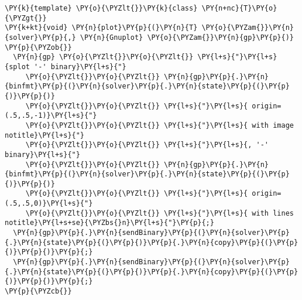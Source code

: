 \begin{Verbatim}[commandchars=\\\{\}]
\PY{k}{template} \PY{o}{\PYZlt{}}\PY{k}{class} \PY{n+nc}{T}\PY{o}{\PYZgt{}}
\PY{k+kt}{void} \PY{n}{plot}\PY{p}{(}\PY{n}{T} \PY{o}{\PYZam{}}\PY{n}{solver}\PY{p}{,} \PY{n}{Gnuplot} \PY{o}{\PYZam{}}\PY{n}{gp}\PY{p}{)}
\PY{p}{\PYZob{}}
  \PY{n}{gp} \PY{o}{\PYZlt{}}\PY{o}{\PYZlt{}} \PY{l+s}{"}\PY{l+s}{splot '-' binary}\PY{l+s}{"} 
     \PY{o}{\PYZlt{}}\PY{o}{\PYZlt{}} \PY{n}{gp}\PY{p}{.}\PY{n}{binfmt}\PY{p}{(}\PY{n}{solver}\PY{p}{.}\PY{n}{state}\PY{p}{(}\PY{p}{)}\PY{p}{)}
     \PY{o}{\PYZlt{}}\PY{o}{\PYZlt{}} \PY{l+s}{"}\PY{l+s}{ origin=(.5,.5,-1)}\PY{l+s}{"}
     \PY{o}{\PYZlt{}}\PY{o}{\PYZlt{}} \PY{l+s}{"}\PY{l+s}{ with image notitle}\PY{l+s}{"}
     \PY{o}{\PYZlt{}}\PY{o}{\PYZlt{}} \PY{l+s}{"}\PY{l+s}{, '-' binary}\PY{l+s}{"} 
     \PY{o}{\PYZlt{}}\PY{o}{\PYZlt{}} \PY{n}{gp}\PY{p}{.}\PY{n}{binfmt}\PY{p}{(}\PY{n}{solver}\PY{p}{.}\PY{n}{state}\PY{p}{(}\PY{p}{)}\PY{p}{)}
     \PY{o}{\PYZlt{}}\PY{o}{\PYZlt{}} \PY{l+s}{"}\PY{l+s}{ origin=(.5,.5,0)}\PY{l+s}{"}
     \PY{o}{\PYZlt{}}\PY{o}{\PYZlt{}} \PY{l+s}{"}\PY{l+s}{ with lines notitle}\PY{l+s+se}{\PYZbs{}n}\PY{l+s}{"}\PY{p}{;}
  \PY{n}{gp}\PY{p}{.}\PY{n}{sendBinary}\PY{p}{(}\PY{n}{solver}\PY{p}{.}\PY{n}{state}\PY{p}{(}\PY{p}{)}\PY{p}{.}\PY{n}{copy}\PY{p}{(}\PY{p}{)}\PY{p}{)}\PY{p}{;}
  \PY{n}{gp}\PY{p}{.}\PY{n}{sendBinary}\PY{p}{(}\PY{n}{solver}\PY{p}{.}\PY{n}{state}\PY{p}{(}\PY{p}{)}\PY{p}{.}\PY{n}{copy}\PY{p}{(}\PY{p}{)}\PY{p}{)}\PY{p}{;}
\PY{p}{\PYZcb{}}


\end{Verbatim}
